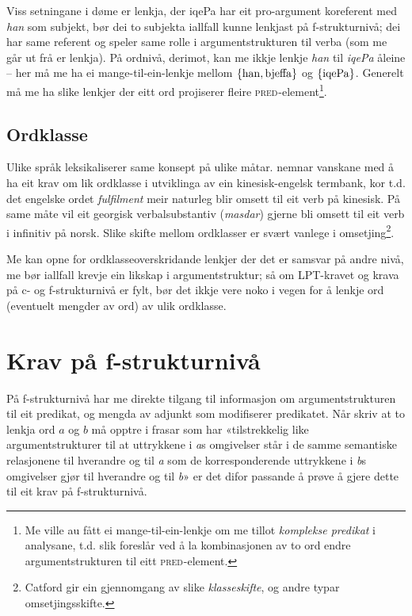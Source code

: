 \documentclass[12pt,a4paper,oneside,draft]{report}
\newcommand{\F}[2]{\textsc{#1}\ensuremath{_{#2}}}
\newcommand{\PRED}{\F{pred}{}}
\begin{document}
Viss setningane i døme \Last er lenkja, der iqePa har eit
 pro\hyp{}argument koreferent med \emph{han} som subjekt, bør dei to
 subjekta iallfall kunne lenkjast på f\hyp{}strukturnivå; dei har same
 referent og speler same rolle i argumentstrukturen til verba (som me
 går ut frå er lenkja). På ordnivå, derimot, kan me ikkje lenkje \emph{han}
 til \emph{iqePa} åleine -- her må me ha ei mange-til-ein-lenkje mellom $\{
 \rm han, bjeffa \}$ og $\{ \rm iqePa \}$.  Generelt må me ha slike
 lenkjer der eitt ord projiserer fleire \PRED{}-element\footnote{Me ville au fått ei mange-til-ein-lenkje om me tillot
        \emph{komplekse predikat} i analysane, t.d. slik
        \citet{butt1998merger} foreslår ved å la kombinasjonen av to
        ord endre argumentstrukturen til eitt \PRED{}-element. }.

\subsection{Ordklasse}
\label{sec-3.5.1}

Ulike språk leksikaliserer same konsept på ulike
måtar. \citet[s.~3]{cheung2002scg} nemnar vanskane med å ha eit krav
om lik ordklasse i utviklinga av ein kinesisk-engelsk termbank, kor
t.d. det engelske ordet \emph{fulfilment} meir naturleg blir omsett til eit
verb på kinesisk. På same måte vil eit georgisk verbalsubstantiv
(\emph{masdar}) gjerne bli omsett til eit verb i infinitiv på
norsk. Slike skifte mellom ordklasser er svært vanlege i
omsetjing\footnote{Catford \citep[1965, i][s.~61]{munday2001its} gir ein gjennomgang av
       slike \emph{klasseskifte}, og andre typar omsetjingsskifte. }.

Me kan opne for ordklasseoverskridande lenkjer der det er samsvar på
andre nivå, me bør iallfall krevje ein likskap i argumentstruktur; så
om LPT-kravet og krava på c- og f\hyp{}strukturnivå er fylt, bør det ikkje
vere noko i vegen for å lenkje ord (eventuelt mengder av ord) av ulik
ordklasse.


\section{Krav på f\hyp{}strukturnivå}
\label{sec-3.6}

 
På f\hyp{}strukturnivå har me direkte tilgang til informasjon om
argumentstrukturen til eit predikat, og mengda av adjunkt som
modifiserer predikatet. Når \citet[s.~3]{thunes2003eal} skriv at to
lenkja ord $a$ og $b$ må opptre i frasar som har «tilstrekkelig like
argumentstrukturer til at uttrykkene i \emph{a}s omgivelser står i de
samme semantiske relasjonene til hverandre og til \emph{a} som de
korresponderende uttrykkene i \emph{b}s omgivelser gjør til hverandre
og til \emph{b}» er det difor passande å prøve å gjere dette til eit
krav på f\hyp{}strukturnivå.
\end{document}
